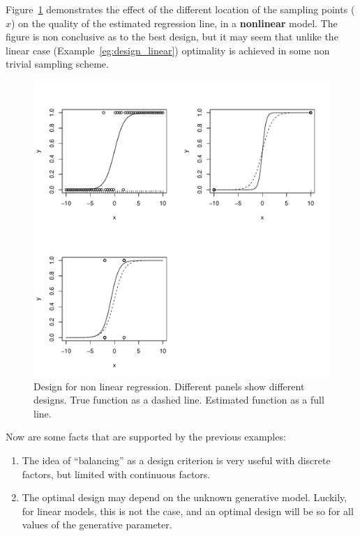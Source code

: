 \begin{example}
Figure~\ref{fig:design_nonlinear} demonstrates the effect of the different location of the sampling points ($x$) on the quality of the estimated regression line, in a \textbf{nonlinear} model.
The figure is non conclusive as to the best design, but it may seem that unlike the linear case (Example~\ref{eg:design_linear}) optimality is achieved in some non trivial sampling scheme.
\begin{figure}[ht]
\centering
\includegraphics[height=0.3\textheight]{art/nonlinear}
\caption[Design for Non Linear Models]{Design for non linear regression. Different panels show different designs. True function as a dashed line. Estimated function as a full line.}
\label{fig:design_nonlinear}
\end{figure}
\end{example}





Now are some facts that are supported by the previous examples:
\begin{enumerate}
\item The idea of ``balancing'' as a design criterion is very useful with discrete factors, but limited with continuous factors. 
\item The optimal design may depend on the unknown generative model. Luckily, for linear models, this is not the case, and an optimal design will be so for all values of the generative parameter.
\end{enumerate}



